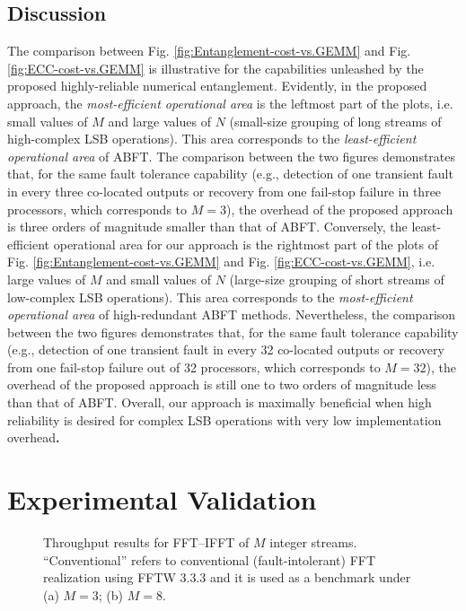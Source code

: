 \documentclass[twocolumn,english,onecolumn]{IEEEtran}
\theoremstyle{plain}
\theoremstyle{plain}
\begin{document}
\subsection{Discussion}

The comparison between Fig. \ref{fig:Entanglement-cost-vs.GEMM} and
Fig. \ref{fig:ECC-cost-vs.GEMM} is illustrative for the capabilities
unleashed by the proposed highly-reliable numerical entanglement.
Evidently, in the proposed approach, the \emph{most-efficient operational
area} is the leftmost part of the plots, i.e. small values of $M$
and large values of $N$ (small-size grouping of long streams of high-complex
LSB operations). This area corresponds to the \emph{least-efficient
operational area} of ABFT. The comparison between the two figures
demonstrates that, for the same fault tolerance capability (e.g.,
detection of one transient fault in every three co-located outputs
or recovery from one fail-stop failure in three processors, which
corresponds to $M=3$), the overhead of the proposed approach is three
orders of magnitude smaller than that of ABFT. Conversely, the least-efficient
operational area for our approach is the rightmost part of the plots
of Fig. \ref{fig:Entanglement-cost-vs.GEMM} and Fig. \ref{fig:ECC-cost-vs.GEMM},
i.e. large values of $M$ and small values of $N$ (large-size grouping
of short streams of low-complex LSB operations). This area corresponds
to the \emph{most-efficient operational area} of high-redundant ABFT
methods. Nevertheless, the comparison between the two figures demonstrates
that, for the same fault tolerance capability (e.g., detection of
one transient fault in every 32 co-located outputs or recovery from
one fail-stop failure out of 32 processors, which corresponds to $M=32$),
the overhead of the proposed approach is still one to two orders of
magnitude less than that of ABFT. Overall, our approach is maximally
beneficial when high reliability is desired for complex LSB operations
with very low implementation overhead\textbf{.}


\section{Experimental Validation\label{sec:Experiments}}

\begin{figure*}[tbh]
\begin{centering}
\par\end{centering}

\protect\caption{Throughput results for FFT--IFFT of $M$ integer streams. ``Conventional''
refers to conventional (fault-intolerant) FFT realization using FFTW
3.3.3 and it is used as a benchmark under (a) $M=3$; (b) $M=8$.
\label{fig:FFT-benchmark}}
\end{figure*}
\end{document}

